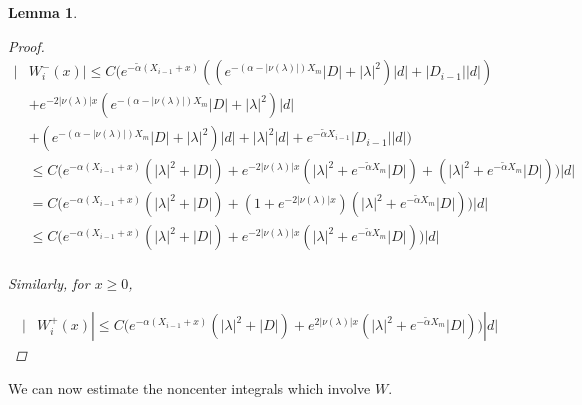 \documentclass[12pt]{article}
\newtheorem{lemma}{Lemma}
\begin{document}
\begin{lemma}
\begin{proof}
\begin{align*}
| &W_i^-(x)| \leq C \Big(e^{-\tilde{\alpha}(X_{i-1} + x)}(( e^{-(\alpha - |\nu(\lambda)|) X_m} |D| + |\lambda|^2 )|d| + |D_{i-1}||d| ) \\
&+ e^{-2|\nu(\lambda)|x} ( e^{-(\alpha - |\nu(\lambda)|) X_m}|D| + |\lambda|^2 )|d| \\ 
&+ ( e^{-(\alpha - |\nu(\lambda)|) X_m} |D| + |\lambda|^2 )|d| + |\lambda|^2 |d| + e^{-\tilde{\alpha} X_{i-1}} |D_{i-1}||d| \Big) \\
&\leq C \Big(e^{-\alpha(X_{i-1} + x)}( |\lambda|^2 + |D|)
+ e^{-2|\nu(\lambda)|x} ( |\lambda|^2 + e^{-\tilde{\alpha} X_m}|D|) + (|\lambda|^2 + e^{-\tilde{\alpha} X_m} |D| ) \Big)|d| \\
&= C \Big(e^{-\alpha(X_{i-1} + x)}( |\lambda|^2 + |D|)
+ (1 + e^{-2|\nu(\lambda)|x} )( |\lambda|^2 + e^{-\tilde{\alpha} X_m}|D|) \Big)|d| \\
&\leq C \Big(e^{-\alpha(X_{i-1} + x)}( |\lambda|^2 + |D|)
+ e^{-2|\nu(\lambda)|x}( |\lambda|^2 + e^{-\tilde{\alpha} X_m}|D|) \Big)|d| \\
\end{align*}

Similarly, for $x \geq 0$,

\begin{align*}
| &W_i^+(x)| \leq C \Big(e^{-\alpha(X_{i-1} + x)}( |\lambda|^2 + |D|)
+ e^{2|\nu(\lambda)|x}( |\lambda|^2 + e^{-\tilde{\alpha} X_m}|D|) \Big)|d| 
\end{align*}

\end{proof}
\end{lemma}

We can now estimate the noncenter integrals which involve $W$.
\end{document}
